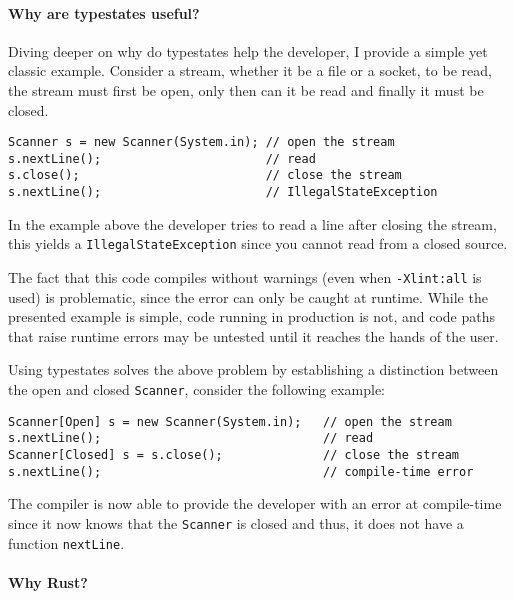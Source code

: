\documentclass{article}
\begin{document}
\paragraph{Why are typestates useful?}

Diving deeper on why do typestates help the developer, I provide a simple yet classic example.
Consider a stream, whether it be a file or a socket, to be read, the stream must first be open,
only then can it be read and finally it must be closed.

\begin{verbatim}
Scanner s = new Scanner(System.in); // open the stream
s.nextLine();                       // read
s.close();                          // close the stream
s.nextLine();                       // IllegalStateException
\end{verbatim}

In the example above the developer tries to read a line after closing the stream,
this yields a \texttt{IllegalStateException} since you cannot read from a closed source.

The fact that this code compiles without warnings (even when \texttt{-Xlint:all} is used) is problematic,
since the error can only be caught at runtime.
While the presented example is simple,
code running in production is not,
and code paths that raise runtime errors may be untested until it reaches the hands of the user.

Using typestates solves the above problem by establishing a distinction between the open and closed \texttt{Scanner},
consider the following example:

\begin{verbatim}
Scanner[Open] s = new Scanner(System.in);   // open the stream
s.nextLine();                               // read
Scanner[Closed] s = s.close();              // close the stream
s.nextLine();                               // compile-time error
\end{verbatim}

The compiler is now able to provide the developer with an error at compile-time since it now knows that the \texttt{Scanner} is closed and thus,
it does not have a function \texttt{nextLine}.

\paragraph{Why Rust?}

\end{document}
